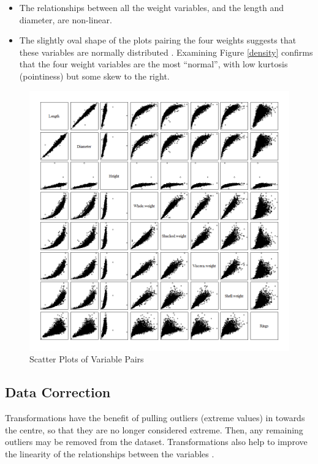 \documentclass[11pt, a4paper]{article}
\begin{document}
    \begin{itemize}
        \item The relationships between all the weight variables, and the length and diameter, are non-linear.
        \item The slightly oval shape of the plots pairing the four weights suggests that these variables are normally distributed \parencite{assumptions}. Examining Figure \ref{density} confirms that the four weight variables are the most ``normal'', with low kurtosis (pointiness) but some skew to the right.
    \end{itemize}

    \begin{figure}[hbt!]
        \centering
        \includegraphics[width=\textwidth]{1.3.png}
        \caption{Scatter Plots of Variable Pairs}
        \label{pairs}
    \end{figure}

    \subsection{Data Correction}

    Transformations have the benefit of pulling outliers (extreme values) in towards the centre, so that they are no longer considered extreme. Then, any remaining outliers may be removed from the dataset. Transformations also help to improve the linearity of the relationships between the variables \parencite{transformations}.
\end{document}

